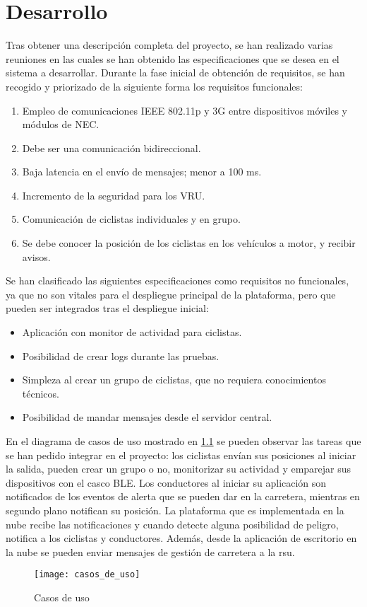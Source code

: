 \chapter{Desarrollo}\label{cha:desarrollo}
Tras obtener una descripción completa del proyecto, se han realizado varias reuniones en las cuales se han obtenido las especificaciones que se desea en el sistema a desarrollar. Durante la fase inicial de obtención de requisitos, se han recogido y priorizado de la siguiente forma los requisitos funcionales:

\begin{enumerate}
	\item Empleo de comunicaciones IEEE 802.11p y 3G entre dispositivos móviles y módulos de NEC.
	\item Debe ser una comunicación bidireccional.
	\item Baja latencia en el envío de mensajes; menor a 100 ms.
	\item Incremento de la seguridad para los VRU.
	\item Comunicación de ciclistas individuales y en grupo.
	\item Se debe conocer la posición de los ciclistas en los vehículos a motor, y recibir avisos.
\end{enumerate}

Se han clasificado las siguientes especificaciones como requisitos no funcionales, ya que no son vitales para el despliegue principal de la plataforma, pero que pueden ser integrados tras el despliegue inicial:
\begin{itemize}
	\item Aplicación con monitor de actividad para ciclistas.
	\item Posibilidad de crear logs durante las pruebas.
	\item Simpleza al crear un grupo de ciclistas, que no requiera conocimientos técnicos.
	\item Posibilidad de mandar mensajes desde el servidor central.
\end{itemize}

En el diagrama de casos de uso mostrado en \ref{fig:casos_de_uso} se pueden observar las tareas que se han pedido integrar en el proyecto: los ciclistas envían sus posiciones al iniciar la salida, pueden crear un grupo o no, monitorizar su actividad y emparejar sus dispositivos con el casco BLE. Los conductores al iniciar su aplicación son notificados de los eventos de alerta que se pueden dar en la carretera, mientras en segundo plano notifican su posición. La plataforma que es implementada en la nube recibe las notificaciones y cuando detecte alguna posibilidad de peligro, notifica a los ciclistas y conductores. Además, desde la aplicación de escritorio en la nube se pueden enviar mensajes de gestión de carretera a la \gls{rsu}.
\begin{figure}[H]
	\begin{center}
		\texttt{[image: casos\_de\_uso]}
		\caption{Casos de uso}
		\label{fig:casos_de_uso}
	\end{center}
\end{figure}


